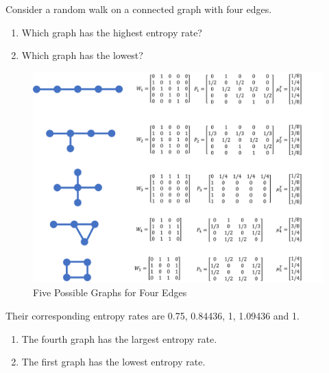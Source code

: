 \begin{exercise}{Consider a random walk on a connected graph with four edges.
  \begin{enumerate}
    \item Which graph has the highest entropy rate?
    \item Which graph has the lowest?
  \end{enumerate}}
\begin{solution}
      \begin{figure}[htbp]
        \centering
        \includegraphics[width=16cm]{img/4-1.png}
        \caption{Five Possible Graphs for Four Edges}
        \label{fig:ex11}
      \end{figure}

      Their corresponding entropy rates are 0.75, 0.84436, 1, 1.09436 and 1.
  \begin{enumerate}
    \item {
    The fourth graph has the largest entropy rate.
    }
    \item { The first graph has the lowest entropy rate.
    }
  \end{enumerate}
  \end{solution}
  \label{ex11}
\end{exercise}